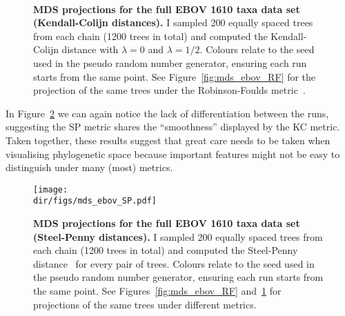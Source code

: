 \begin{figure}[!ht]
\begin{center}
\\
\end{center}
 \caption[MDS projections for the full EBOV 1610 taxa data set (Kendall-Colijn distances).]{\textbf{MDS projections for the full EBOV 1610 taxa data set (Kendall-Colijn distances).}
 I sampled 200 equally spaced trees from each chain (1200 trees in total) and computed the Kendall-Colijn distance with $\lambda = 0$ and $\lambda = 1/2$.
 Colours relate to the seed used in the pseudo random number generator, ensuring each run starts from the same point.  
 See Figure~\ref{fig:mds_ebov_RF} for the projection of the same trees under the Robinson-Foulds metric~\citep{Robinson1981}.
 }
 \label{fig:mds_ebov_KC}
\end{figure}

In Figure~\ref{fig:mds_ebov_SP} we can again notice the lack of differentiation between the runs, suggesting the SP metric shares the ``smoothness''  displayed by the KC metric.
Taken together, these results suggest that great care needs to be taken when visualising phylogenetic space because important features might not be easy to distinguish under many (most) metrics.

\begin{figure}[!ht]
\begin{center}
\texttt{[image: \\dir/figs/mds\_ebov\_SP.pdf]} 
\end{center}
 \caption[MDS projections for the full EBOV 1610 taxa data set (Steel-Penny distances).]{\textbf{MDS projections for the full EBOV 1610 taxa data set (Steel-Penny distances).}
 I sampled 200  equally spaced trees from each chain (1200 trees in total) and computed the Steel-Penny distance~\citep{Steel1993} for every pair of trees.
 Colours relate to the seed used in the pseudo random number generator, ensuring each run starts from the same point. 
 See Figures~\ref{fig:mds_ebov_RF} and~\ref{fig:mds_ebov_KC} for projections of the same trees under different metrics.
 }
 \label{fig:mds_ebov_SP}
\end{figure}

